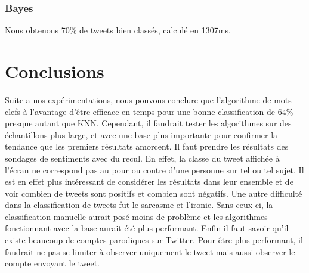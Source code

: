 \documentclass[a4paper,10pt]{report}
\begin{document}
    \subsection{Bayes}
      Nous obtenons 70\% de tweets bien classés, calculé en 1307ms.
    
    
\chapter{Conclusions}
Suite a nos expérimentations, nous pouvons conclure que l'algorithme de mots clefs à l'avantage d'être efficace en temps pour une bonne classification de 64\%
presque autant que KNN.
\newline\newline
Cependant, il faudrait tester les algorithmes sur des échantillons plus large, et avec une base plus importante pour confirmer la tendance que les premiers résultats amorcent.
\newline\newline
Il faut prendre les résultats des sondages de sentiments avec du recul. En effet, la classe du tweet affichée à
l'écran ne correspond pas au pour ou contre d'une personne sur tel ou tel sujet. Il est en effet plus intéressant de considérer les résultats dans leur ensemble et de voir combien de tweets sont positifs et combien sont négatifs.
\newline\newline
Une autre difficulté dans la classification de tweets fut le sarcasme et l'ironie. Sans ceux-ci, la classification manuelle aurait posé moins de problème et les algorithmes fonctionnant avec la base aurait été plus performant.
\newline\newline
Enfin il faut savoir qu'il existe beaucoup de comptes parodiques sur Twitter. Pour être plus performant,
il faudrait ne pas se limiter à observer uniquement le tweet mais aussi observer le compte envoyant le tweet.
\end{document}
